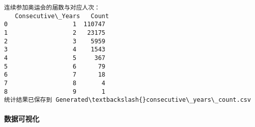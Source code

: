 \documentclass[11pt]{article}
\begin{document}
    \begin{Verbatim}[commandchars=\\\{\}]
连续参加奥运会的届数与对应人次：
   Consecutive\_Years   Count
0                  1  110747
1                  2   23175
2                  3    5959
3                  4    1543
4                  5     367
5                  6      79
6                  7      18
7                  8       4
8                  9       1
统计结果已保存到 Generated\textbackslash{}consecutive\_years\_count.csv
    \end{Verbatim}

    \paragraph{数据可视化}\label{ux6570ux636eux53efux89c6ux5316}
\end{document}
